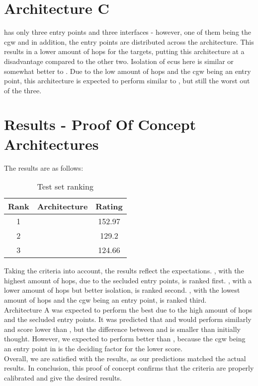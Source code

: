 \section{Architecture C}
\label{sec:archc}

 has only three entry points and three interfaces - however, one of them being the \acrshort{cgw} and 
in addition, the entry points are distributed across the architecture. 
This results in a lower amount of hops for the targets, putting this architecture at a disadvantage compared to the other two.
Isolation of \acrshort{ecu}s here is similar or somewhat better to .
Due to the low amount of hops and the \acrshort{cgw} being an entry point, this architecture is expected to perform 
similar to , but still the worst out of the three.


\section{Results - Proof Of Concept Architectures}
\label{sec:resultsproof}

The results are as follows:\\

\begin{table}[h]
    \label{table:pocranking}
    \centering
    \begin{tabular}{ |c|c|c| } 
    \hline
    Rank & Architecture & Rating\\
    \hline
    1 & \nameref{fig:architectureA} & 152.97\\ 
    2 & \nameref{fig:architectureB} & 129.2\\
    3 & \nameref{fig:architectureC} & 124.66\\
    \hline
    \end{tabular}
    \caption{Test set ranking}
\end{table}

\hfill \break

Taking the criteria into account, the results reflect the expectations.
, with the highest amount of hops, due to the secluded entry points, is ranked first.
, with a lower amount of hops but better isolation, is ranked second.
, with the lowest amount of hops and the \acrshort{cgw} being an entry point, is ranked third.\\

Architecture A was expected to perform the best due to the high amount of hops and the secluded entry points.
It was predicted that  and  would perform similarly and score lower than ,
but the difference between  and  is smaller than initially thought. 
However, we expected  to perform better than , 
because the \acrshort{cgw} being an entry point in  is the deciding factor for the lower score.\\

Overall, we are satisfied with the results, as our predictions matched the actual results.
In conclusion, this proof of concept confirms that the criteria are properly calibrated and give the desired results.